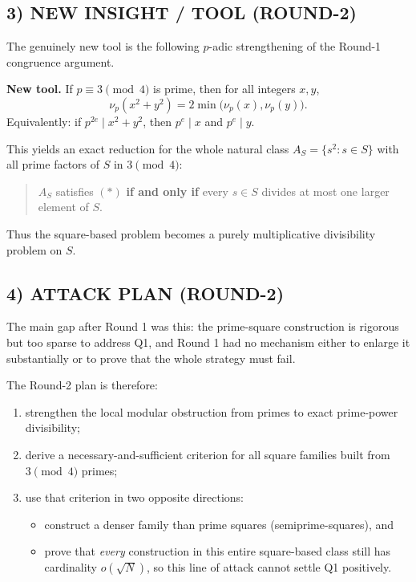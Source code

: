 \subsection*{3) NEW INSIGHT / TOOL (ROUND-2)}

The genuinely new tool is the following $p$-adic strengthening of the Round-1 congruence argument.

\medskip
\noindent\textbf{New tool.}
If $p\equiv 3\pmod 4$ is prime, then for all integers $x,y$,
\[
\nu_p(x^2+y^2)=2\min\bigl(\nu_p(x),\nu_p(y)\bigr).
\]
Equivalently: if $p^{2e}\mid x^2+y^2$, then $p^e\mid x$ and $p^e\mid y$.
\medskip

This yields an exact reduction for the whole natural class $A_S=\{s^2:s\in S\}$ with all prime factors of $S$ in $3\pmod 4$:
\begin{quote}
$A_S$ satisfies $(*)$ \textbf{if and only if} every $s\in S$ divides at most one larger element of $S$.
\end{quote}
Thus the square-based problem becomes a purely multiplicative divisibility problem on $S$.

\subsection*{4) ATTACK PLAN (ROUND-2)}

The main gap after Round 1 was this: the prime-square construction is rigorous but too sparse to address Q1, and Round 1 had no mechanism either to enlarge it substantially or to prove that the whole strategy must fail.

The Round-2 plan is therefore:
\begin{enumerate}
\item strengthen the local modular obstruction from primes to exact prime-power divisibility;
\item derive a necessary-and-sufficient criterion for all square families built from $3\pmod 4$ primes;
\item use that criterion in two opposite directions:
\begin{itemize}
\item construct a denser family than prime squares (semiprime-squares), and
\item prove that \emph{every} construction in this entire square-based class still has cardinality $o(\sqrt N)$, so this line of attack cannot settle Q1 positively.
\end{itemize}
\end{enumerate}

